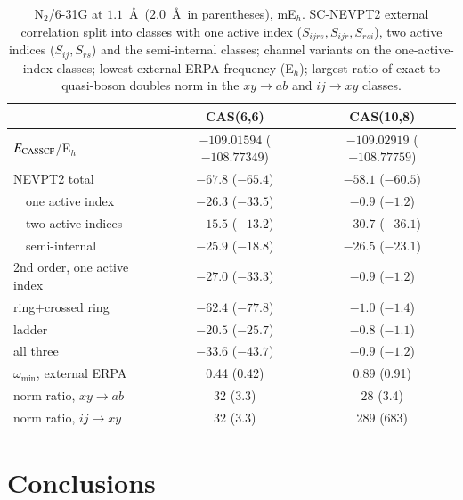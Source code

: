 \documentclass[aip,jcp,reprint,noshowkeys,superscriptaddress]{revtex4-1}
\begin{document}
\begin{table}[t]
\caption{N$_2$/6-31G at $1.1$~\AA\ ($2.0$~\AA\ in parentheses), mE$_h$.
SC-NEVPT2 external correlation split into classes with one active index
($S_{ijrs},S_{ijr},S_{rsi}$), two active indices ($S_{ij},S_{rs}$) and the
semi-internal classes; channel variants on the one-active-index classes;
lowest external ERPA frequency (E$_h$); largest ratio of exact to quasi-boson
doubles norm in the $xy\to ab$ and $ij\to xy$ classes.}
\label{tab:actsize}
\begin{ruledtabular}
\begin{tabular}{lcc}
 & CAS(6,6) & CAS(10,8)\\
\hline
$E_{\rm CASSCF}$/E$_h$ & $-109.01594$ ($-108.77349$) & $-109.02919$ ($-108.77759$)\\
NEVPT2 total & $-67.8$ ($-65.4$) & $-58.1$ ($-60.5$)\\
\ \ one active index & $-26.3$ ($-33.5$) & $-0.9$ ($-1.2$)\\
\ \ two active indices & $-15.5$ ($-13.2$) & $-30.7$ ($-36.1$)\\
\ \ semi-internal & $-25.9$ ($-18.8$) & $-26.5$ ($-23.1$)\\
2nd order, one active index & $-27.0$ ($-33.3$) & $-0.9$ ($-1.2$)\\
ring$+$crossed ring & $-62.4$ ($-77.8$) & $-1.0$ ($-1.4$)\\
ladder & $-20.5$ ($-25.7$) & $-0.8$ ($-1.1$)\\
all three & $-33.6$ ($-43.7$) & $-0.9$ ($-1.2$)\\
$\omega_{\min}$, external ERPA & 0.44 (0.42) & 0.89 (0.91)\\
norm ratio, $xy\to ab$ & 32 (3.3) & 28 (3.4)\\
norm ratio, $ij\to xy$ & 32 (3.3) & 289 (683)\\
\end{tabular}
\end{ruledtabular}
\end{table}

\section{Conclusions}
\label{sec:conclusions}
\end{document}
